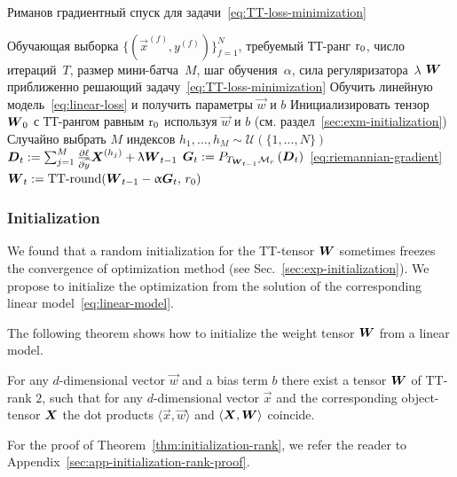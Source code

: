 \begin{algorithm}[t]
   \caption{Риманов градиентный спуск для задачи~\eqref{eq:TT-loss-minimization}}
   \label{alg:rimeannian-optimization}
\begin{algorithmic}
   \REQUIRE Обучающая выборка $\{(\vec{x}^{(f)}, y^{(f)})\}_{f=1}^N$, требуемый ТТ-ранг $\operatorname{r}_0$, число итераций~$T$, размер мини-батча~$M$, шаг обучения~$\alpha$, сила регуляризатора~$\lambda$
   \ENSURE $\boldsymbol{W}$ приближенно решающий задачу~\eqref{eq:TT-loss-minimization}
   \STATE Обучить линейную модель~\eqref{eq:linear-loss} и получить параметры $\vec{w}$ и $b$
   \STATE Инициализировать тензор $\boldsymbol{W}_0$ с ТТ-рангом равным $\operatorname{r}_0$ используя $\vec{w}$ и $b$  (см. раздел~\ref{sec:exm-initialization})
        \STATE Случайно выбрать $M$ индексов $h_1, \ldots, h_M \sim \mathcal{U}(\{1, \ldots, N\})$
        \STATE $\boldsymbol{D}_t := \sum_{j=1}^M \frac{\partial \ell}{\partial \widehat{y}} \boldsymbol{X}^{(h_j)}  + \uplambda \boldsymbol{W}_{t-1}$
        \STATE $\boldsymbol{G}_t := P_{T_{\boldsymbol{W}_{t-1}} \mathcal{M}_r}\left ( \boldsymbol{D}_t \right)$~\eqref{eq:riemannian-gradient}
        \STATE $\boldsymbol{W}_{t} := \operatorname{TT-round}(\boldsymbol{W}_{t-1} - \upalpha \boldsymbol{G}_t, \,r_0)$
   \ENDFOR
\end{algorithmic}
\end{algorithm}


\subsubsection{Initialization \label{sec:exm-initialization}}
We found that a random initialization for the TT-tensor $\boldsymbol{W}$ sometimes freezes the convergence of optimization method (see Sec.~\ref{sec:exp-initialization}).
We propose to initialize the optimization from the solution of the corresponding linear model~\eqref{eq:linear-model}.

The following theorem shows how to initialize the weight tensor $\boldsymbol{W}$ from a linear model.
\begin{theorem}
\label{thm:initialization-rank}
For any $d$-dimensional vector $\vec{w}$ and a bias term $b$ there exist a tensor $\boldsymbol{W}$ of TT-rank $2$, such that for any $d$-dimensional vector $\vec{x}$ and the corresponding object-tensor $\boldsymbol{X}$ the dot products $\langle \vec{x}, \vec{w} \rangle$ and $\langle \boldsymbol{X}, \boldsymbol{W} \rangle$ coincide.
\end{theorem}
For the proof of Theorem~\ref{thm:initialization-rank}, we refer the reader to Appendix~\ref{sec:app-initialization-rank-proof}.

